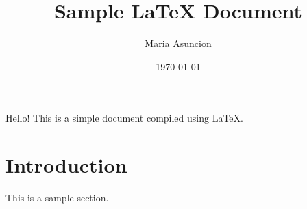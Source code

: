 \documentclass{article}
\begin{document}
\title{Sample LaTeX Document}
\author{Maria Asuncion}
\date{\today}

\maketitle

Hello! This is a simple document compiled using \LaTeX{}.

\section{Introduction}
This is a sample section.
\end{document}
